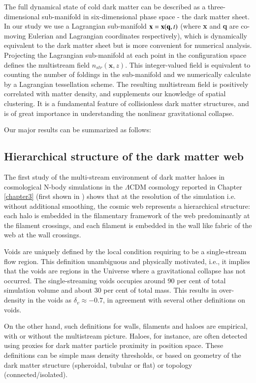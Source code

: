 The full dynamical state of cold dark matter can be described as a three-dimensional sub-manifold
in six-dimensional phase space - the dark matter sheet. In our study we use a Lagrangian sub-manifold ${\bf x} = {\bf x}({\bf q},t)$ 
(where {\bf x} and {\bf q} are co-moving Eulerian and Lagrangian coordinates respectively), which 
is dynamically equivalent to the dark matter sheet but is more convenient for numerical analysis. Projecting the Lagrangian sub-manifold at each point in the configuration space defines the multistream field  $n_{str}(\mathbf{x}, z)$. This integer-valued field is equivalent to counting the number of foldings in the sub-manifold and we numerically calculate by a Lagrangian tessellation scheme. The resulting multistream field is positively correlated with matter density, and supplements our knowledge of spatial clustering. It is a fundamental feature of collisionless dark matter structures, and is of great importance in understanding the nonlinear gravitational collapse.

Our major results can be summarized as follows:

\subsection{Hierarchical structure of the dark matter web}
The first study of the multi-stream environment of dark matter haloes in cosmological N-body simulations in the $\Lambda$CDM cosmology reported in Chapter \ref{chapter3} (first shown in \citealt{Ramachandra2015}) shows that at the resolution of the simulation i.e. without additional smoothing, the cosmic web represents a hierarchical structure: each halo is embedded in the filamentary framework of the web predominantly at the filament crossings, and each filament is embedded in the wall like fabric of the web at the wall crossings. 

Voids are uniquely defined by the local condition requiring to be a single-stream flow region. This definition unambiguous and physically motivated, i.e., it implies that the voids are regions in the Universe where a gravitational collapse has not occurred. The single-streaming voids occupies around 90 per cent of total simulation volume and about 30 per cent of total mass. This results in over-density in the voids as $\delta_{v} \approx -0.7$, in agreement with several other definitions on voids.  

On the other hand, such definitions for walls, filaments and haloes are empirical, with or without the multistream picture. Haloes, for instance, are often detected using proxies for dark matter particle proximity in position space. These definitions can be simple mass density thresholds, or based on geometry of the dark matter structure (spheroidal, tubular or flat) or topology (connected/isolated). 

